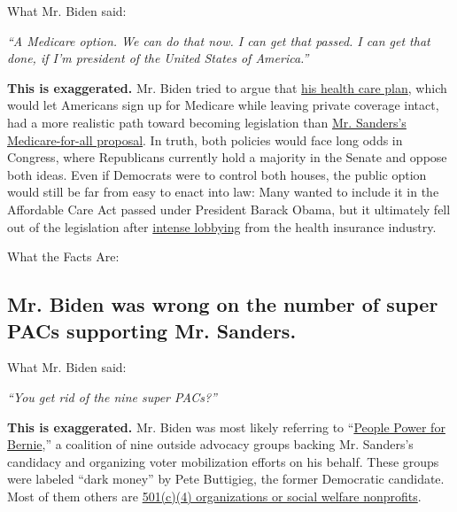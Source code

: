 What Mr. Biden said:

\emph{``A Medicare option. We can do that now. I can get that passed. I
can get that done, if I'm president of the United States of America.''}

\textbf{This is exaggerated.} Mr. Biden tried to argue that
\href{https://www.nytimes3xbfgragh.onion/2019/07/15/us/politics/biden-health-care.html}{his
health care plan}, which would let Americans sign up for Medicare while
leaving private coverage intact, had a more realistic path toward
becoming legislation than
\href{https://www.nytimes3xbfgragh.onion/2019/06/27/us/politics/bernie-sanders-medicare-for-all.html}{Mr.
Sanders's Medicare-for-all proposal}. In truth, both policies would face
long odds in Congress, where Republicans currently hold a majority in
the Senate and oppose both ideas. Even if Democrats were to control both
houses, the public option would still be far from easy to enact into
law: Many wanted to include it in the Affordable Care Act passed under
President Barack Obama, but it ultimately fell out of the legislation
after
\href{https://www.nytimes3xbfgragh.onion/2009/06/11/us/politics/11health.html}{intense
lobbying} from the health insurance industry.

What the Facts Are:

\hypertarget{mr-biden-was-wrong-on-the-number-of-super-pacs-supporting-mr-sanders}{%
\subsection{Mr. Biden was wrong on the number of super PACs supporting
Mr.
Sanders.}\label{mr-biden-was-wrong-on-the-number-of-super-pacs-supporting-mr-sanders}}

What Mr. Biden said:

\emph{``You get rid of the nine super PACs?''}

\textbf{This is exaggerated.} Mr. Biden was most likely referring to
``\href{https://slack-redir.net/link?url=https\%3A\%2F\%2Fpeoplesaction.org\%2F2020\%2F01\%2Fnine-groups-that-endorsed-sanders-join-forces-to-drive-black-brown-working-class-and-young-voter-turnout-in-primaries\%2F}{People
Power for Bernie},'' a coalition of nine outside advocacy groups backing
Mr. Sanders's candidacy and organizing voter mobilization efforts on his
behalf. These groups were labeled ``dark money'' by Pete Buttigieg, the
former Democratic candidate. Most of them others are
\href{https://www.nytimes3xbfgragh.onion/2020/02/18/us/politics/pete-buttigieg-fact-check.html}{501(c)(4)
organizations or social welfare nonprofits}.


